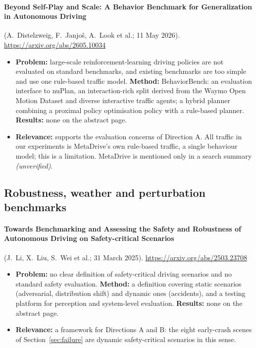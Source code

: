 \paragraph{Beyond Self-Play and Scale: A Behavior Benchmark for Generalization in Autonomous Driving} (A.~Distelzweig, F.~Janjo\v{s}, A.~Look et al.; 11 May 2026). \url{https://arxiv.org/abs/2605.10034}
\begin{itemize}
\item \textbf{Problem:} large-scale reinforcement-learning driving policies are not evaluated on standard benchmarks, and existing benchmarks are too simple and use one rule-based traffic model. \textbf{Method:} BehaviorBench: an evaluation interface to nuPlan, an interaction-rich split derived from the Waymo Open Motion Dataset and diverse interactive traffic agents; a hybrid planner combining a proximal policy optimisation policy with a rule-based planner. \textbf{Results:} none on the abstract page.
\item \textbf{Relevance:} supports the evaluation concerns of Direction A. All traffic in our experiments is MetaDrive's own rule-based traffic, a single behaviour model; this is a limitation. MetaDrive is mentioned only in a search summary \emph{(unverified)}.
\end{itemize}

\subsection{Robustness, weather and perturbation benchmarks}

\paragraph{Towards Benchmarking and Assessing the Safety and Robustness of Autonomous Driving on Safety-critical Scenarios} (J.~Li, X.~Liu, S.~Wei et al.; 31 March 2025). \url{https://arxiv.org/abs/2503.23708}
\begin{itemize}
\item \textbf{Problem:} no clear definition of safety-critical driving scenarios and no standard safety evaluation. \textbf{Method:} a definition covering static scenarios (adversarial, distribution shift) and dynamic ones (accidents), and a testing platform for perception and system-level evaluation. \textbf{Results:} none on the abstract page.
\item \textbf{Relevance:} a framework for Directions A and B: the eight early-crash scenes of Section~\ref{sec:failure} are dynamic safety-critical scenarios in this sense.
\end{itemize}

